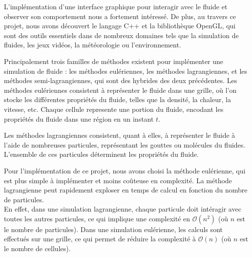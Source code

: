 \documentclass[a4paper]{article}
\begin{document}
L'implémentation d'une interface graphique pour 
interagir avec le fluide et observer son comportement nous a fortement intéressé. 
De plus, au travers ce projet, 
nous avons découvert le langage C++ et la bibliothèque OpenGL, qui sont des outils 
essentiels dans de nombreux domaines tels que la simulation de fluides, les jeux 
vidéos, la météorologie ou l'environnement.




    Principalement trois familles de méthodes existent pour 
    implémenter une simulation de fluide : les méthodes eulériennes, les méthodes 
    lagrangiennes, et les méthodes semi-lagrangiennes, qui 
    sont des hybrides des deux précédentes. Les méthodes eulériennes 
    \label{part:eulerienne}
    consistent à représenter le fluide dans une grille, où l'on stocke les différentes 
    propriétés du fluide, telles que la densité, la chaleur, la vitesse, etc. Chaque 
    cellule represente une portion du fluide, encodant les propriétés du fluide dans 
    une région en un instant $t$.

    Les méthodes lagrangiennes consistent, quant à elles, à représenter le fluide à 
    l'aide de nombreuses particules, représentant les gouttes ou molécules du 
    fluides. L'ensemble de ces particules déterminent les propriétés du fluide.



    Pour l'implémentation de ce projet, nous avons choisi la méthode eulérienne, qui 
    est plus simple à implémenter et moins coûteuse en complexité. La méthode 
    lagrangienne peut rapidement exploser en temps de calcul en fonction du nombre de 
    particules. \\
    En effet, dans une simulation lagrangienne, chaque particule doit intéragir avec toutes les autres particules,
    ce qui implique une complexité en $\mathcal{O}(n^2)$ (où $n$ est le nombre de particules). 
    Dans une simulation eulérienne, les calculs sont effectués sur une grille, ce qui permet de réduire la 
    complexité à $\mathcal{O}(n)$ (où $n$ est le nombre de cellules).


\end{document}
